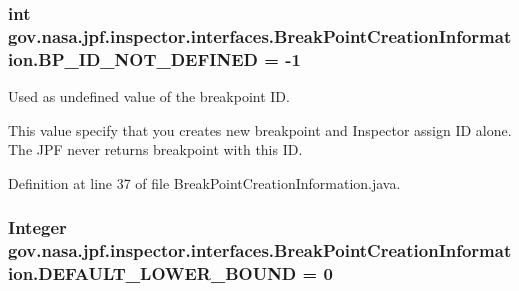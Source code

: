 \subsubsection[{\texorpdfstring{B\+P\+\_\+\+I\+D\+\_\+\+N\+O\+T\+\_\+\+D\+E\+F\+I\+N\+ED}{BP_ID_NOT_DEFINED}}]{\setlength{\rightskip}{0pt plus 5cm}int gov.\+nasa.\+jpf.\+inspector.\+interfaces.\+Break\+Point\+Creation\+Information.\+B\+P\+\_\+\+I\+D\+\_\+\+N\+O\+T\+\_\+\+D\+E\+F\+I\+N\+ED = -\/1\hspace{0.3cm}{\ttfamily [inherited]}}\hypertarget{interfacegov_1_1nasa_1_1jpf_1_1inspector_1_1interfaces_1_1_break_point_creation_information_a24626231e3744e59f505d0731d4ca9e1}{}\label{interfacegov_1_1nasa_1_1jpf_1_1inspector_1_1interfaces_1_1_break_point_creation_information_a24626231e3744e59f505d0731d4ca9e1}


Used as undefined value of the breakpoint ID. 

This value specify that you creates new breakpoint and Inspector assign ID alone. The J\+PF never returns breakpoint with this ID. 

Definition at line 37 of file Break\+Point\+Creation\+Information.\+java.

\subsubsection[{\texorpdfstring{D\+E\+F\+A\+U\+L\+T\+\_\+\+L\+O\+W\+E\+R\+\_\+\+B\+O\+U\+ND}{DEFAULT_LOWER_BOUND}}]{\setlength{\rightskip}{0pt plus 5cm}Integer gov.\+nasa.\+jpf.\+inspector.\+interfaces.\+Break\+Point\+Creation\+Information.\+D\+E\+F\+A\+U\+L\+T\+\_\+\+L\+O\+W\+E\+R\+\_\+\+B\+O\+U\+ND = 0\hspace{0.3cm}{\ttfamily [inherited]}}\hypertarget{interfacegov_1_1nasa_1_1jpf_1_1inspector_1_1interfaces_1_1_break_point_creation_information_a40131b93f82a84ed5322c4dc5ca4175e}{}\label{interfacegov_1_1nasa_1_1jpf_1_1inspector_1_1interfaces_1_1_break_point_creation_information_a40131b93f82a84ed5322c4dc5ca4175e}


